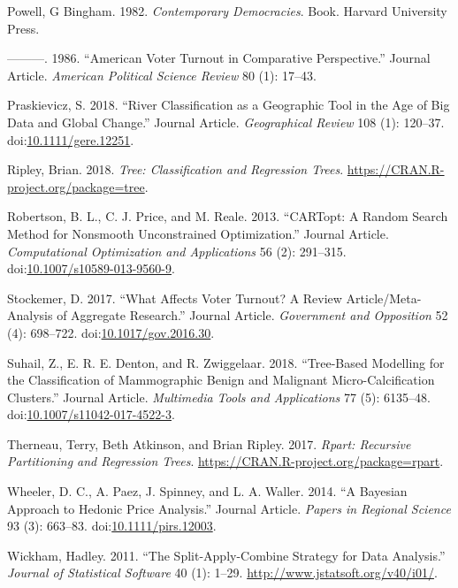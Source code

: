 \documentclass[]{elsarticle} %
\begin{document}
\hypertarget{ref-Powell1982}{}
Powell, G Bingham. 1982. \emph{Contemporary Democracies}. Book. Harvard
University Press.

\hypertarget{ref-Powell1986}{}
---------. 1986. ``American Voter Turnout in Comparative Perspective.''
Journal Article. \emph{American Political Science Review} 80 (1):
17--43.

\hypertarget{ref-Praskievicz2018}{}
Praskievicz, S. 2018. ``River Classification as a Geographic Tool in the
Age of Big Data and Global Change.'' Journal Article. \emph{Geographical
Review} 108 (1): 120--37.
doi:\href{https://doi.org/10.1111/gere.12251}{10.1111/gere.12251}.

\hypertarget{ref-Ripley2018}{}
Ripley, Brian. 2018. \emph{Tree: Classification and Regression Trees}.
\url{https://CRAN.R-project.org/package=tree}.

\hypertarget{ref-Robertson2013}{}
Robertson, B. L., C. J. Price, and M. Reale. 2013. ``CARTopt: A Random
Search Method for Nonsmooth Unconstrained Optimization.'' Journal
Article. \emph{Computational Optimization and Applications} 56 (2):
291--315.
doi:\href{https://doi.org/10.1007/s10589-013-9560-9}{10.1007/s10589-013-9560-9}.

\hypertarget{ref-Stockemer2017}{}
Stockemer, D. 2017. ``What Affects Voter Turnout? A Review
Article/Meta-Analysis of Aggregate Research.'' Journal Article.
\emph{Government and Opposition} 52 (4): 698--722.
doi:\href{https://doi.org/10.1017/gov.2016.30}{10.1017/gov.2016.30}.

\hypertarget{ref-Suhail2018}{}
Suhail, Z., E. R. E. Denton, and R. Zwiggelaar. 2018. ``Tree-Based
Modelling for the Classification of Mammographic Benign and Malignant
Micro-Calcification Clusters.'' Journal Article. \emph{Multimedia Tools
and Applications} 77 (5): 6135--48.
doi:\href{https://doi.org/10.1007/s11042-017-4522-3}{10.1007/s11042-017-4522-3}.

\hypertarget{ref-Therneau2017}{}
Therneau, Terry, Beth Atkinson, and Brian Ripley. 2017. \emph{Rpart:
Recursive Partitioning and Regression Trees}.
\url{https://CRAN.R-project.org/package=rpart}.

\hypertarget{ref-Wheeler2014}{}
Wheeler, D. C., A. Paez, J. Spinney, and L. A. Waller. 2014. ``A
Bayesian Approach to Hedonic Price Analysis.'' Journal Article.
\emph{Papers in Regional Science} 93 (3): 663--83.
doi:\href{https://doi.org/10.1111/pirs.12003}{10.1111/pirs.12003}.

\hypertarget{ref-Wickham2011}{}
Wickham, Hadley. 2011. ``The Split-Apply-Combine Strategy for Data
Analysis.'' \emph{Journal of Statistical Software} 40 (1): 1--29.
\url{http://www.jstatsoft.org/v40/i01/}.
\end{document}
